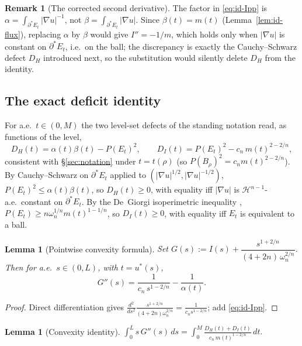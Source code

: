 \documentclass[11pt]{amsart}
\newtheorem{lemma}[theorem]{Lemma}
\theoremstyle{definition}
\newtheorem{remark}[theorem]{Remark}
\newcommand{\Hn}{\mathcal H^{n-1}}
\newcommand{\Per}{P}
\begin{document}
\begin{remark}[The corrected second derivative]\label{rem:id-alpha}
The factor in \eqref{eq:id-Ipp} is \(\alpha=\int_{\partial^*E_t}|\nabla u|^{-1}\),
not \(\beta=\int_{\partial^*E_t}|\nabla u|\).  Since \(\beta(t)=m(t)\)
(Lemma~\ref{lem:id-flux}), replacing \(\alpha\) by \(\beta\) would give
\(I''=-1/m\), which holds only when \(|\nabla u|\) is constant on
\(\partial^*E_t\), i.e.\ on the ball; the discrepancy is exactly the
Cauchy--Schwarz defect \(D_H\) introduced next, so the substitution would
silently delete \(D_H\) from the identity.
\end{remark}

\subsection*{The exact deficit identity}

For a.e.\ \(t\in(0,M)\) the two level-set defects of the standing notation read,
as functions of the level,
\[
   D_H(t)=\alpha(t)\beta(t)-\Per(E_t)^2,\qquad
   D_I(t)=\Per(E_t)^2-c_n\,m(t)^{2-2/n},
\]
consistent with \S\ref{sec:notation} under \(t=t(\rho)\) (so
\(\Per(B_\rho)^2=c_n m(t)^{2-2/n}\)).  By Cauchy--Schwarz on
\(\partial^*E_t\) applied to \((|\nabla u|^{1/2},|\nabla u|^{-1/2})\),
\(\Per(E_t)^2\le\alpha(t)\beta(t)\), so \(D_H(t)\ge0\), with equality iff
\(|\nabla u|\) is \(\Hn\)-a.e.\ constant on \(\partial^*E_t\).  By the De~Giorgi
isoperimetric inequality \cite{DeGiorgi1958,Maggi2012},
\(\Per(E_t)\ge n\omega_n^{1/n}m(t)^{1-1/n}\), so \(D_I(t)\ge0\), with equality
iff \(E_t\) is equivalent to a ball.

\begin{lemma}[Pointwise convexity formula]\label{lem:id-Gpp}
Set \(G(s):=I(s)+\dfrac{s^{1+2/n}}{(4+2n)\,\omega_n^{2/n}}\).  Then for a.e.\
\(s\in(0,L)\), with \(t=u^*(s)\),
\[
   G''(s)=\frac{1}{c_n\,s^{1-2/n}}-\frac{1}{\alpha(t)} .
\]
\end{lemma}

\begin{proof}
Direct differentiation gives
\(\frac{d^2}{ds^2}\frac{s^{1+2/n}}{(4+2n)\omega_n^{2/n}}
=\frac{1}{c_n s^{1-2/n}}\); add \eqref{eq:id-Ipp}.
\end{proof}

\begin{lemma}[Convexity identity]\label{lem:id-cov}
\(\displaystyle\int_0^L s\,G''(s)\,ds
   =\int_0^M\frac{D_H(t)+D_I(t)}{c_n\,m(t)^{1-2/n}}\,dt.\)
\end{lemma}
\end{document}
